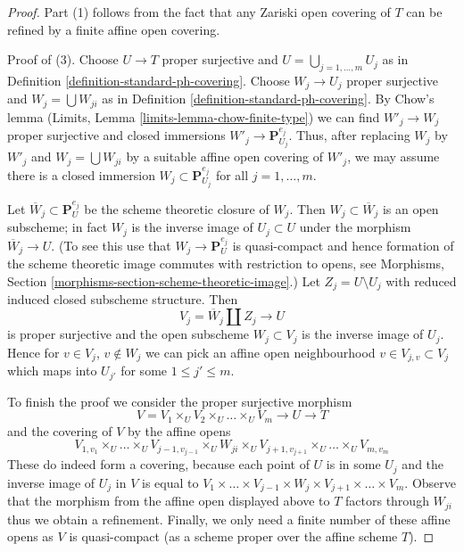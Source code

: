 \begin{proof}
Part (1) follows from the fact that any Zariski open covering of $T$
can be refined by a finite affine open covering.

\medskip\noindent
Proof of (3). Choose $U \to T$ proper surjective and
$U = \bigcup_{j = 1, \ldots, m} U_j$ as in
Definition \ref{definition-standard-ph-covering}.
Choose $W_j \to U_j$ proper surjective and $W_j = \bigcup W_{ji}$
as in Definition \ref{definition-standard-ph-covering}.
By Chow's lemma (Limits, Lemma \ref{limits-lemma-chow-finite-type})
we can find $W'_j \to W_j$ proper surjective
and closed immersions $W'_j \to \mathbf{P}^{e_j}_{U_j}$.
Thus, after replacing $W_j$ by $W'_j$ and $W_j = \bigcup W_{ji}$
by a suitable affine open covering of $W'_j$, we may assume
there is a closed immersion $W_j \subset \mathbf{P}^{e_j}_{U_j}$
for all $j = 1, \ldots, m$.

\medskip\noindent
Let $\overline{W}_j \subset \mathbf{P}^{e_j}_U$ be the
scheme theoretic closure of $W_j$. Then $W_j \subset \overline{W}_j$
is an open subscheme; in fact $W_j$ is the inverse image of
$U_j \subset U$ under the morphism $\overline{W}_j \to U$.
(To see this use that $W_j \to \mathbf{P}^{e_j}_U$ is quasi-compact
and hence formation of the scheme theoretic image commutes
with restriction to opens, see
Morphisms, Section \ref{morphisms-section-scheme-theoretic-image}.)
Let $Z_j = U \setminus U_j$
with reduced induced closed subscheme structure.
Then
$$
V_j = \overline{W}_j \amalg Z_j \to U
$$
is proper surjective and the open subscheme $W_j \subset V_j$
is the inverse image of $U_j$. Hence for $v \in V_j$, $v \not \in W_j$
we can pick an affine open neighbourhood $v \in V_{j, v} \subset V_j$
which maps into $U_{j'}$ for some $1 \leq j' \leq m$.

\medskip\noindent
To finish the proof we consider the proper surjective morphism
$$
V = V_1 \times_U V_2 \times_U \ldots \times_U V_m
\longrightarrow U \longrightarrow T
$$
and the covering of $V$ by the affine opens
$$
V_{1, v_1} \times_U \ldots \times_U V_{j - 1, v_{j - 1}}
\times_U W_{j i} \times_U
V_{j + 1, v_{j + 1}} \times_U \ldots \times_U V_{m, v_m}
$$
These do indeed form a covering, because each point of $U$ is
in some $U_j$ and the inverse image of $U_j$ in $V$ is equal to
$V_1 \times \ldots \times V_{j - 1} \times W_j \times V_{j + 1} \times
\ldots \times V_m$. Observe that the morphism from
the affine open displayed above to $T$ factors through $W_{ji}$
thus we obtain a refinement. Finally, we only need a finite number
of these affine opens as $V$ is quasi-compact (as a scheme proper
over the affine scheme $T$).
\end{proof}

